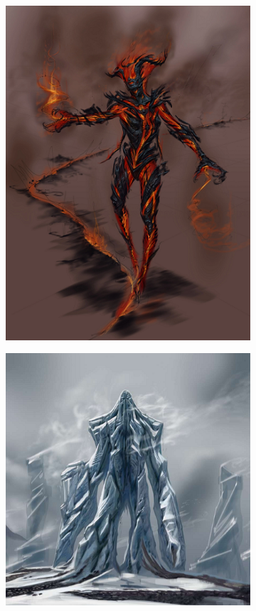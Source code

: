 \documentclass[12pt]{book}
\begin{document}
\begin{figure}[h]
	\begin{subfigure}{0.3\textwidth}
		\centering
		\includegraphics[scale=0.5]{flameatronach.png}
	\end{subfigure}
	\begin{subfigure}{0.3\textwidth}
		\centering
		\includegraphics[scale=0.4]{frostatronach.png}

\end{subfigure}
\end{figure}
\end{document}
